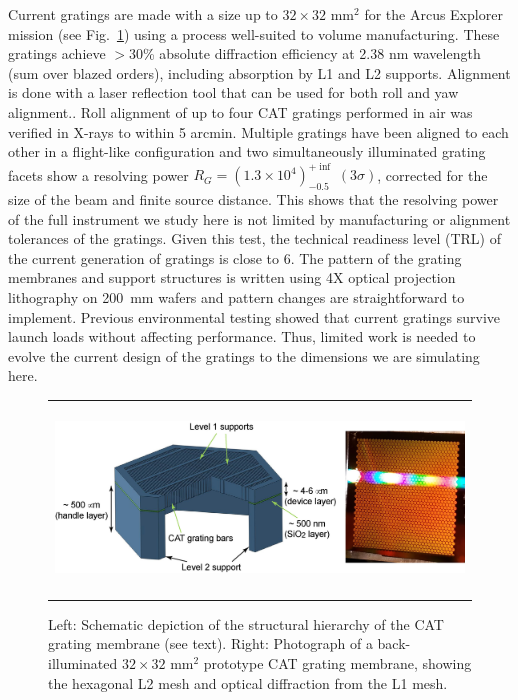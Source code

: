 \documentclass[12pt]{spieman}  %
\begin{document}
\begin{spacing}{1}
Current gratings are made with a size up to $32\times32$ mm$^2$ for the Arcus Explorer mission\cite{doi:10.1117/12.2272818} (see Fig.~\ref{fig:cell}) using a process well-suited to volume manufacturing.  These gratings achieve $> 30$\% absolute diffraction efficiency at 2.38 nm wavelength (sum over blazed orders), including absorption by L1 and L2 supports\cite{doi:10.1117/12.2314180}. Alignment is done with a laser reflection tool that can be used for both roll and yaw alignment.\cite{doi:10.1117/12.2274206}. Roll alignment of up to four CAT gratings performed in air was verified in X-rays to within 5 arcmin\cite{doi:10.1117/12.2273000,doi:10.1117/12.2314180}. Multiple gratings have been aligned to each other in a flight-like configuration and two simultaneously illuminated grating facets show a resolving power $R_G=(1.3\times10^4)^{+\inf}_{-0.5}\;(3\sigma)$, corrected for the size of the beam and finite source distance\cite{2022arXiv220609013H}. This shows that the resolving power of the full instrument we study here is not limited by manufacturing or alignment tolerances of the gratings. Given this test, the technical readiness level (TRL) of the current generation of gratings is close to 6. The pattern of the grating membranes and support structures is written using 4X optical projection lithography on 200~mm wafers and pattern changes are straightforward to implement. Previous environmental testing showed that current gratings survive launch loads without affecting performance\cite{doi:10.1117/12.2273000}. Thus, limited work is needed to evolve the current design of the gratings to the dimensions we are simulating here.

\begin{figure} [ht]
\begin{center}
\begin{tabular}{c} %
\includegraphics[height=5cm]{unitcell+pic.jpg}
\end{tabular}
\end{center}
\caption {\label{fig:cell}
Left: Schematic depiction of the structural hierarchy of the CAT grating membrane (see text). Right: Photograph of a back-illuminated $32\times32$ mm$^2$ prototype CAT grating membrane, showing the hexagonal L2 mesh and optical diffraction from the L1 mesh.
}
\end{figure}



\end{spacing}
\end{document}
